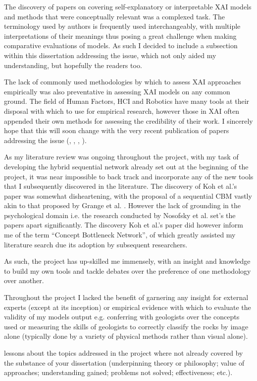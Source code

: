 The discovery of papers on covering self-explanatory or interpretable XAI models and methods that were conceptually relevant was a complexed task. The terminology used by authors is frequently used interchangeably, with multiple interpretations of their meanings thus posing a great challenge when making comparative evaluations of models. As such I decided to include a subsection within this dissertation addressing the issue, which not only aided my understanding, but hopefully the readers too.

The lack of commonly used methodologies by which to assess XAI approaches empirically was also preventative in assessing XAI models on any common ground. The field of Human Factors, HCI and Robotics have many tools at their disposal with which to use for empirical research, however those in XAI often appended their own methods for assessing the credibility of their work.  I sincerely hope that this will soon change with the very recent publication of papers addressing the issue (\cite{hoffmanMeasuresExplainableAI2023}, \cite{uenoTrustHumanAIInteraction2022}, \cite{perrigTrustIssuesTrust2023}, \cite{kleinMinimumNecessaryRigor2023}).

As my literature review was ongoing throughout the project, with my task of developing the hybrid sequential network already set out at the beginning of the project, it was near impossible to back track and incorporate any of the new tools that I subsequently discovered in the literature. The discovery of Koh et al.’s \cite{kohConceptBottleneckModels2020} paper was somewhat disheartening, with the proposal of a sequential CBM vastly akin to that proposed by Grange et al. \cite{grangeXAISelfexplanatoryAI2022}. However the lack of grounding in the psychological domain i.e. the research conducted by Nosofsky et al. set’s the papers apart significantly. The discovery Koh et al.’s paper did however inform me of the term “Concept Bottleneck Network”, of which greatly assisted my literature search due its adoption by subsequent researchers.

As such, the project has up-skilled me immensely, with an insight and knowledge to build my own tools and tackle debates over the preference of one methodology over another.

Throughout the project I lacked the benefit of garnering any insight for external experts (except at its inception) or empirical evidence with which to evaluate the validity of my models output e.g. conferring with geologists over the concepts used or measuring the skills of geologists to correctly classify the rocks by image alone (typically done by a variety of physical methods rather than visual alone). 

lessons about the topics addressed in the project where not already covered by the substance of your dissertation (underpinning theory or philosophy; value of approaches; understanding gained; problems not solved; effectiveness; etc.). 